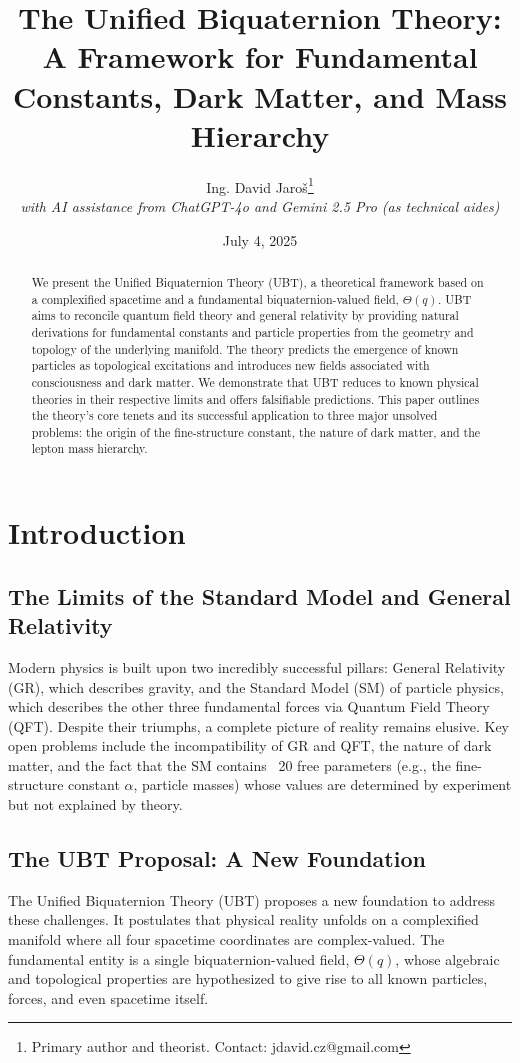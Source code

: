 \documentclass[12pt, a4paper]{article}
\title{\textbf{The Unified Biquaternion Theory: A Framework for Fundamental Constants, Dark Matter, and Mass Hierarchy}}
\author{Ing. David Jaroš\thanks{Primary author and theorist. Contact: jdavid.cz@gmail.com} \\
\textit{with AI assistance from ChatGPT-4o and Gemini 2.5 Pro (as technical aides)}}
\date{July 4, 2025}
\begin{document}
\maketitle

\begin{abstract}
We present the Unified Biquaternion Theory (UBT), a theoretical framework based on a complexified spacetime and a fundamental biquaternion-valued field, \( \Theta(q) \). UBT aims to reconcile quantum field theory and general relativity by providing natural derivations for fundamental constants and particle properties from the geometry and topology of the underlying manifold. The theory predicts the emergence of known particles as topological excitations and introduces new fields associated with consciousness and dark matter. We demonstrate that UBT reduces to known physical theories in their respective limits and offers falsifiable predictions. This paper outlines the theory's core tenets and its successful application to three major unsolved problems: the origin of the fine-structure constant, the nature of dark matter, and the lepton mass hierarchy.
\end{abstract}

\tableofcontents
\newpage

\section{Introduction}

\subsection{The Limits of the Standard Model and General Relativity}
Modern physics is built upon two incredibly successful pillars: General Relativity (GR), which describes gravity, and the Standard Model (SM) of particle physics, which describes the other three fundamental forces via Quantum Field Theory (QFT). Despite their triumphs, a complete picture of reality remains elusive. Key open problems include the incompatibility of GR and QFT, the nature of dark matter, and the fact that the SM contains ~20 free parameters (e.g., the fine-structure constant \(\alpha\), particle masses) whose values are determined by experiment but not explained by theory.

\subsection{The UBT Proposal: A New Foundation}
The Unified Biquaternion Theory (UBT) proposes a new foundation to address these challenges. It postulates that physical reality unfolds on a complexified manifold where all four spacetime coordinates are complex-valued. The fundamental entity is a single biquaternion-valued field, \( \Theta(q) \), whose algebraic and topological properties are hypothesized to give rise to all known particles, forces, and even spacetime itself.
\end{document}
